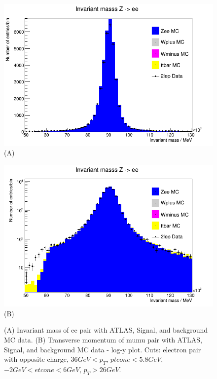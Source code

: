 \begin{figure}[h!]
    \centering
    \begin{minipage}{0.5\textwidth}
        \centering
        \includegraphics[width=\linewidth]{plots/03-03-2021/10-30_03-03-21.png}
        (A)
    \end{minipage}\hfill
    \begin{minipage}{0.5\textwidth}
        \centering
        \includegraphics[width=\linewidth]{plots/03-03-2021/10-31_03-03-21.png}
        (B)
    \end{minipage}
    \caption{(A) Invariant mass of ee pair with ATLAS, Signal, and background MC data. (B) Transverse momentum of mumu pair with ATLAS, Signal, and background MC data - log-y plot.  Cuts: electron pair with opposite charge, $36 GeV < p_T$, $ ptcone < 5.8 GeV$, $ -2 GeV < etcone < 6 GeV$, $p_T > 26 GeV $.}
    \label{fig:10-30_03-03-21}
\end{figure}

